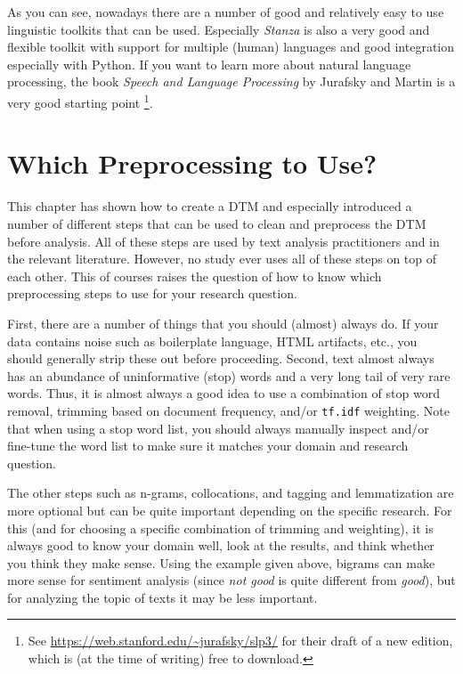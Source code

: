 As you can see, nowadays there are a number of good and relatively easy to use linguistic toolkits that can be used.
Especially \emph{Stanza} \citep{stanza} is also a very good and flexible toolkit with support for multiple (human) languages and good integration especially with Python.
If you want to learn more about natural language processing, the book \emph{Speech and Language Processing} by Jurafsky and Martin is a very good starting point \citep{jurafsky}\footnote{See \url{https://web.stanford.edu/~jurafsky/slp3/} for their draft of a new edition, which is (at the time of writing) free to download.}.


\section{Which Preprocessing to Use?}

This chapter has shown how to create a DTM and especially introduced a number of different steps that can be used to clean and preprocess the DTM before analysis.
All of these steps are used by text analysis practitioners and in the relevant literature.
However, no study ever uses all of these steps on top of each other.
This of courses raises the question of how to know which preprocessing steps to use for your research question.

First, there are a number of things that you should (almost) always do.
If your data contains noise such as boilerplate language, HTML artifacts, etc., you should generally strip these out before proceeding.
Second, text almost always has an abundance of uninformative (stop) words and a very long tail of very rare words.
Thus, it is almost always a good idea to use a combination of stop word removal, trimming based on document frequency, and/or \verb|tf.idf| weighting.
Note that when using a stop word list, you should always manually inspect and/or fine-tune the word list to make sure it matches your domain and research question.

The other steps such as n-grams, collocations, and tagging and lemmatization are more optional but can be quite important depending on the specific research.
For this (and for choosing a specific combination of trimming and weighting), it is always good to know your domain well, look at the results, and think whether you think they make sense.
Using the example given above, bigrams can make more sense for sentiment analysis (since \emph{not good} is quite different from \emph{good}),
but for analyzing the topic of texts it may be less important.

